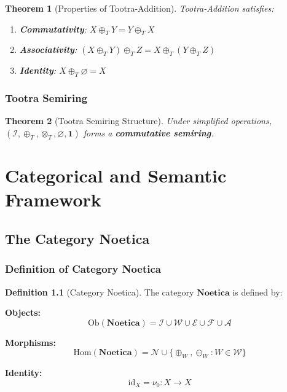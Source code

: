 \documentclass[11pt,twoside,openright]{book}
\theoremstyle{definition}
\newtheorem{definition}{Definition}[chapter]
\theoremstyle{plain}
\newtheorem{theorem}[definition]{Theorem}
\theoremstyle{remark}
\newcommand{\Worlds}{\mathcal{W}}
\newcommand{\Ideas}{\mathcal{I}}
\newcommand{\Elements}{\mathcal{E}}
\newcommand{\Noetics}{\mathcal{N}}
\newcommand{\Foundations}{\mathcal{F}}
\newcommand{\Acquisitions}{\mathcal{A}}
\newcommand{\Noetica}{\mathbf{Noetica}}
\newcommand{\noe}[1]{\nu_{#1}}
\newcommand{\Tadd}{\oplus_T}
\newcommand{\Tmul}{\otimes_T}
\newcommand{\Ob}{\mathrm{Ob}}
\newcommand{\Hom}{\mathrm{Hom}}
\newcommand{\id}{\mathrm{id}}
\begin{document}
\begin{theorem}[Properties of Tootra-Addition]
\label{thm:tadd-properties}
Tootra-Addition satisfies:
\begin{enumerate}
  \item \textbf{Commutativity}: $X \Tadd Y = Y \Tadd X$
  \item \textbf{Associativity}: $(X \Tadd Y) \Tadd Z = X \Tadd (Y \Tadd Z)$
  \item \textbf{Identity}: $X \Tadd \varnothing = X$
\end{enumerate}
\end{theorem}

\section{Tootra Semiring}

\begin{theorem}[Tootra Semiring Structure]
\label{thm:semiring}
Under simplified operations, $(\Ideas, \Tadd, \Tmul, \varnothing, \mathbf{1})$ forms a \textbf{commutative semiring}.
\end{theorem}

\part{Categorical and Semantic Framework}

\chapter{The Category Noetica}
\label{ch:category-noetica}

\section{Definition of Category Noetica}

\begin{definition}[Category Noetica]
\label{def:category-noetica}
The category $\Noetica$ is defined by:

\textbf{Objects:}
\[
\Ob(\Noetica) = \Ideas \cup \Worlds \cup \Elements \cup \Foundations \cup \Acquisitions
\]

\textbf{Morphisms:}
\[
\Hom(\Noetica) = \Noetics \cup \{\oplus_W, \ominus_W : W \in \Worlds\}
\]

\textbf{Identity:}
\[
\id_X = \noe{0} : X \to X
\]
\end{definition}
\end{document}
